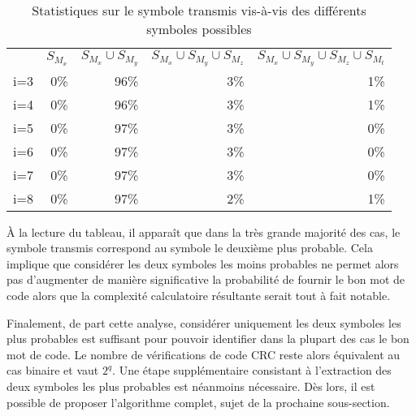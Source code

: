 \begin{table}[!tb]
    \centering
    \caption{Statistiques sur le symbole transmis vis-à-vis des différents symboles possibles}
    \label{tab:symb}
        \begin{tabular}{lrrrr}
            \toprule
            		& $S_{M_x}$	& $S_{M_x}\cup S_{M_y}$	& $S_{M_x}\cup S_{M_y}\cup S_{M_z}$ & $S_{M_x}\cup S_{M_y}\cup S_{M_z}\cup S_{M_t}$ \\
            \cmidrule(l){2-2}\cmidrule(l){3-3}\cmidrule(l){4-4}\cmidrule(l){5-5}
            i=3     &	0\%		&	96\%	& 	3\%		&	1\%		\\
            i=4     &	0\%		&	96\%	& 	3\%		&	1\%		\\
            i=5     &	0\%		&	97\%	& 	3\%		&	0\%		\\
            i=6     &	0\%		&	97\%	& 	3\%		&	0\%		\\
            i=7     &	0\%		&	97\%	& 	3\%		&	0\%		\\
            i=8     &	0\%		&	97\%	& 	2\%		&	1\%	\\
            \bottomrule
        \end{tabular}%
\end{table}
 
À la lecture du tableau, il apparaît que dans la très grande majorité des cas, le symbole transmis 
correspond au symbole le deuxième plus probable. Cela implique que considérer les deux symboles les moins probables ne 
permet alors pas d'augmenter de manière significative la probabilité de fournir le bon mot de code alors que la complexité 
calculatoire résultante serait tout à fait notable.

Finalement, de part cette analyse, considérer uniquement les deux symboles les plus probables est suffisant pour 
pouvoir identifier dans la plupart des cas le bon mot de code. Le nombre de vérifications de code CRC reste alors 
équivalent au cas binaire et vaut $2^q$. Une étape supplémentaire consistant à l'extraction des deux symboles les plus probables est néanmoins 
nécessaire. Dès lors, il est possible de proposer l'algorithme complet, sujet de la prochaine sous-section.

